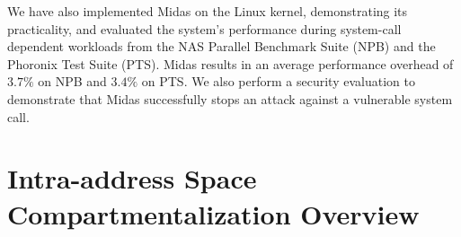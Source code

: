 We have also implemented Midas on the Linux kernel, demonstrating its
practicality, and evaluated the system's performance during system-call
dependent workloads from the NAS Parallel Benchmark Suite (NPB) and the
Phoronix Test Suite (PTS).
Midas results in an average performance overhead of $3.7\%$ on NPB and
$3.4\%$ on PTS.
We also perform a security evaluation to demonstrate that Midas successfully
stops an attack against a vulnerable system call.


\section{Intra-address Space Compartmentalization Overview}

